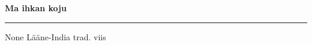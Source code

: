 \documentclass[10pt]{book}
\begin{document}
{
  \samepage
  \raggedbottom
  \raggedright
  \sloppy


  \vspace{0.2in}

  \noindent\begin{minipage}{.1\textwidth}
    \hfill\vspace{0.1in}
  \end{minipage}%
  \noindent\begin{minipage}{.8\textwidth}
    \centering
    \bfseries
    \large Ma ihkan koju
  \end{minipage}%
  \noindent\begin{minipage}{.1\textwidth}
      \hfill\vspace{0.1in}
  \end{minipage}

  \nopagebreak[4]
  \vspace{0.1in}
  \nopagebreak[4]
  \hrule height 0.05ex
  \nopagebreak[4]
  \vspace{-0.05in}

  {\footnotesize None \hfill L\"a\"ane-India trad. viis }\\
  \vspace{0.01in}



}
\end{document}
